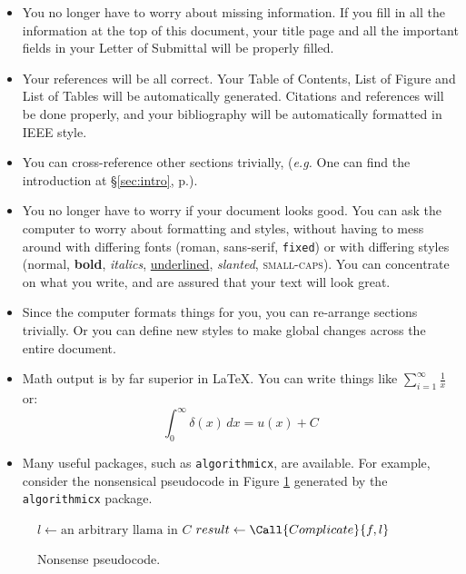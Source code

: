 \documentclass{uw-wkrpt}
\begin{document}
\begin{itemize}
  \item You no longer have to worry about missing information.  If you fill
        in all the information at the top of this document, your title page
        and all the important fields in your Letter of Submittal will be
        properly filled.

  \item Your references will be all correct.  Your Table of Contents,
        List of Figure and List of Tables will be automatically generated.
        Citations and references will be done properly, and your bibliography
        will be automatically formatted in IEEE style.

  \item You can cross-reference other sections trivially, 
        (\emph{e.g.} One can find the introduction at \S\ref{sec:intro}, 
        p.\pageref{sec:intro}).

  \item You no longer have to worry if your document looks good.  You can
        ask the computer to worry about formatting and styles, without having to
        mess around with differing fonts (roman, \textsf{sans-serif},
        \texttt{fixed}) or with differing styles (normal, \textbf{bold},
        \textit{italics}, \underline{underlined}, \textsl{slanted},
        \textsc{small-caps}).  You can concentrate on what you write, and are
        assured that your text will look great.

  \item Since the computer formats things for you, you can re-arrange
        sections trivially.  Or you can define new styles to make global changes
        across the entire document.

  \item Math output is by far superior in \LaTeX.  You can write things
        like $\sum_{i=1}^{\infty} \frac{1}{x}$ or:
        \[\int_{0}^{\infty} \delta(x)\,dx = u(x) + C\]

  \item Many useful packages, such as \texttt{algorithmicx}, are available. For
        example, consider the nonsensical pseudocode in Figure
        \ref{code:nonsense} generated by the \texttt{algorithmicx} package.
\end{itemize}

\begin{figure}
  \caption{Nonsense pseudocode.}
  \label{code:nonsense}
  \begin{algorithmic}[1]
        \State $l \gets \text{an arbitrary llama in $C$}$
        \State {}
        \State $result \gets \Call{Complicate}{f, l}$
          \State {}
        \EndIf
      \EndFor
    \EndFunction
  \end{algorithmic}
\end{figure}
\end{document}
